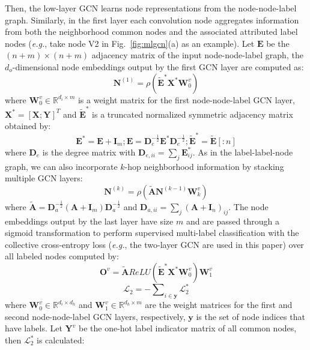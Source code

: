 \documentclass[conference]{IEEEtran}
\begin{document}
Then, the low-layer GCN learns node representations from the node-node-label graph. Similarly, in the first layer each convolution node aggregates information from both the neighborhood common nodes and the associated attributed label nodes (\textit{e.g.}, take node V2 in Fig.~\ref{fig:mlgcn}(a) as an example). Let $\mathbf{E}$ be the $(n+m) \times (n+m)$ adjacency matrix of the input node-node-label graph, the $d_o$-dimensional node embeddings output by the first GCN layer are computed as:
\begin{equation}
\mathbf{N}^{(1)}=\rho (\tilde{\mathbf{E}}^* \mathbf{X}^* \mathbf{W}^v_0)  
\end{equation}
where $\mathbf{W}^v_0 \in \mathbb{R}^{d_i \times m}$ is a weight matrix for the first node-node-label GCN layer, $\mathbf{X}^*=[\mathbf{X};\mathbf{Y}]^T$ and $\tilde{\mathbf{E}}^*$ is a truncated normalized symmetric adjacency matrix obtained by:
\begin{equation}
\mathbf{E}^*=\mathbf{E} + \mathbf{I}_{m};  \mathbf{E}=\mathbf{D}_{e}^{-\frac{1}{2}} \mathbf{E}^{*} \mathbf{D}_{e}^{ - \frac{1}{2}}; \tilde{\mathbf{E}}^*=\tilde{\mathbf{E}}[:n]
\end{equation}
where $\mathbf{D}_e$ is the degree matrix with $\mathbf{D}_{e,ii}=\sum_j \mathbf{E}^*_{ij}$. As in the  label-label-node graph, we can also incorporate $k$-hop neighborhood information by stacking multiple GCN layers:
\begin{equation}
\mathbf{N}^{(k)}=\rho (\tilde{\mathbf{A}} \mathbf{N}^{(k-1)} \mathbf{W}^v_k)
\end{equation}
where $\tilde{\mathbf{A}}=\mathbf{D}_{a}^{-\frac{1}{2}} (\mathbf{A}+\mathbf{I}_m) \mathbf{D}_{a}^{ - \frac{1}{2}}$ and $\mathbf{D}_{a,ii}=\sum_j (\mathbf{A}+\mathbf{I}_n)_{ij}$. The node embeddings output by the last layer have size $m$ and are passed through a sigmoid transformation to perform supervised multi-label classification with the collective cross-entropy loss (\textit{e.g.}, the two-layer GCN are used in this paper) over all labeled nodes computed by:
\begin{equation}
\mathbf{O}^v=\tilde{\mathbf{A}} ReLU (\tilde{\mathbf{E}}^* \mathbf{X}^* \mathbf{W}^v_0)\mathbf{W}^v_1
\end{equation}
\begin{equation}
\mathcal{L}_2=-\sum\nolimits_{i \in \mathbf{y}} \mathcal{L}_2^*
\end{equation}
where $\mathbf{W}^v_0 \in \mathbb{R}^{d_i \times d_h}$ and $\mathbf{W}^v_1 \in \mathbb{R}^{d_h \times m}$ are the weight matrices for the first and second node-node-label GCN layers, respectively, $\mathbf{y}$ is the set of node indices that have labels. Let $\mathbf{Y}^{v}$ be the one-hot label indicator matrix of all common nodes, then $\mathcal{L}_2^{*}$ is calculated:
\end{document}
